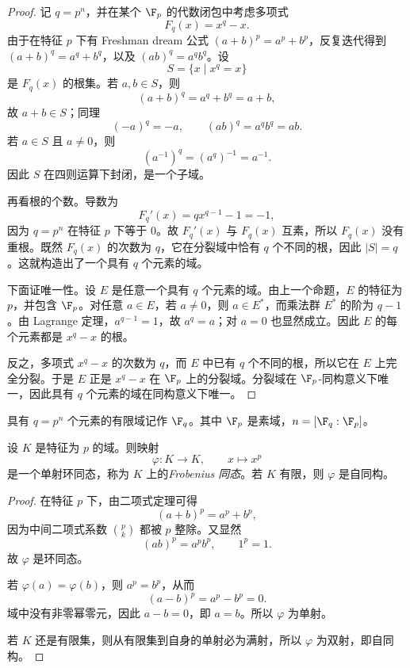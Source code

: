 \begin{proof}
记 $q=p^n$，并在某个 $\F_p$ 的代数闭包中考虑多项式
\[
F_q(x)=x^q-x.
\]
由于在特征 $p$ 下有 Freshman dream 公式 $(a+b)^p=a^p+b^p$，反复迭代得到 $(a+b)^q=a^q+b^q$，以及 $(ab)^q=a^qb^q$。设
\[
S=\{x\mid x^q=x\}
\]
是 $F_q(x)$ 的根集。若 $a,b\in S$，则
\[
(a+b)^q=a^q+b^q=a+b,
\]
故 $a+b\in S$；同理
\[
(-a)^q=-a,\qquad (ab)^q=a^qb^q=ab.
\]
若 $a\in S$ 且 $a\ne0$，则
\[
(a^{-1})^q=(a^q)^{-1}=a^{-1}.
\]
因此 $S$ 在四则运算下封闭，是一个子域。

再看根的个数。导数为
\[
F_q'(x)=qx^{q-1}-1=-1,
\]
因为 $q=p^n$ 在特征 $p$ 下等于 $0$。故 $F_q'(x)$ 与 $F_q(x)$ 互素，所以 $F_q(x)$ 没有重根。既然 $F_q(x)$ 的次数为 $q$，它在分裂域中恰有 $q$ 个不同的根，因此 $|S|=q$。这就构造出了一个具有 $q$ 个元素的域。

下面证唯一性。设 $E$ 是任意一个具有 $q$ 个元素的域。由上一个命题，$E$ 的特征为 $p$，并包含 $\F_p$。对任意 $a\in E$，若 $a\ne0$，则 $a\in E^*$，而乘法群 $E^*$ 的阶为 $q-1$。由 Lagrange 定理，$a^{q-1}=1$，故 $a^q=a$；对 $a=0$ 也显然成立。因此 $E$ 的每个元素都是 $x^q-x$ 的根。

反之，多项式 $x^q-x$ 的次数为 $q$，而 $E$ 中已有 $q$ 个不同的根，所以它在 $E$ 上完全分裂。于是 $E$ 正是 $x^q-x$ 在 $\F_p$ 上的分裂域。分裂域在 $\F_p$-同构意义下唯一，因此具有 $q$ 个元素的域在同构意义下唯一。
\end{proof}

\begin{definition}
具有 $q=p^n$ 个元素的有限域记作 $\F_q$。其中 $\F_p$ 是素域，$n=[\F_q:\F_p]$。
\end{definition}

\begin{proposition}
设 $K$ 是特征为 $p$ 的域。则映射
\[
\varphi:K\longrightarrow K,\qquad x\longmapsto x^p
\]
是一个单射环同态，称为 $K$ 上的\emph{Frobenius 同态}。若 $K$ 有限，则 $\varphi$ 是自同构。
\end{proposition}

\begin{proof}
在特征 $p$ 下，由二项式定理可得
\[
(a+b)^p=a^p+b^p,
\]
因为中间二项式系数 $\binom{p}{k}$ 都被 $p$ 整除。又显然
\[
(ab)^p=a^pb^p,
\qquad 1^p=1.
\]
故 $\varphi$ 是环同态。

若 $\varphi(a)=\varphi(b)$，则 $a^p=b^p$，从而
\[
(a-b)^p=a^p-b^p=0.
\]
域中没有非零幂零元，因此 $a-b=0$，即 $a=b$。所以 $\varphi$ 为单射。

若 $K$ 还是有限集，则从有限集到自身的单射必为满射，所以 $\varphi$ 为双射，即自同构。
\end{proof}

